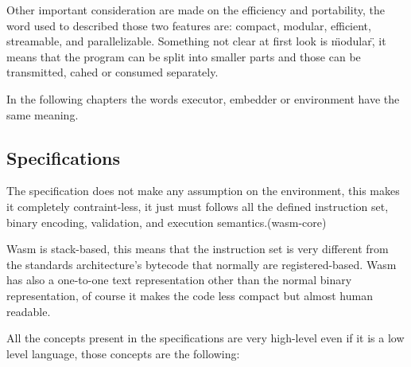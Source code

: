 \documentclass[../main.tex]{subfiles}
\begin{document}
Other important consideration are made on the efficiency and portability, the word used to described those two features are: compact, modular, efficient, streamable, and parallelizable.
Something not clear at first look is \"modular\", it means that the program can be split into smaller parts and those can be transmitted, cahed or consumed separately.

In the following chapters the words executor, embedder or environment have the same meaning.

\subsection{Specifications}

The specification does not make any assumption on the environment, this makes it completely contraint-less, it just must follows all the defined  instruction set, binary encoding, validation, and execution semantics.(wasm-core)

Wasm is stack-based, this means that the instruction set is very different from the standards architecture's bytecode that normally are registered-based. Wasm has also a one-to-one text representation other than the normal binary representation, of course it makes the code less compact but almost human readable.

All the concepts present in the specifications are very high-level even if it is a low level language, those concepts are the following:
\end{document}
